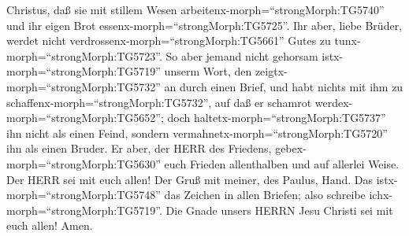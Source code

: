 Christus, daß sie mit stillem Wesen
arbeitenx-morph=``strongMorph:TG5740'' und ihr eigen Brot
essenx-morph=``strongMorph:TG5725''.  Ihr aber, liebe
Brüder, werdet nicht verdrossenx-morph=``strongMorph:TG5661'' Gutes zu
tunx-morph=``strongMorph:TG5723''.  So aber jemand nicht
gehorsam istx-morph=``strongMorph:TG5719'' unserm Wort, den
zeigtx-morph=``strongMorph:TG5732'' an durch einen Brief, und habt
nichts mit ihm zu schaffenx-morph=``strongMorph:TG5732'', auf daß er
schamrot werdex-morph=``strongMorph:TG5652'';  doch
haltetx-morph=``strongMorph:TG5737'' ihn nicht als einen Feind, sondern
vermahnetx-morph=``strongMorph:TG5720'' ihn als einen Bruder.
 Er aber, der HERR des Friedens,
gebex-morph=``strongMorph:TG5630'' euch Frieden allenthalben und auf
allerlei Weise. Der HERR sei mit euch allen!  Der Gruß mit
meiner, des Paulus, Hand. Das istx-morph=``strongMorph:TG5748'' das
Zeichen in allen Briefen; also schreibe
ichx-morph=``strongMorph:TG5719''.  Die Gnade unsers HERRN
Jesu Christi sei mit euch allen! Amen.
